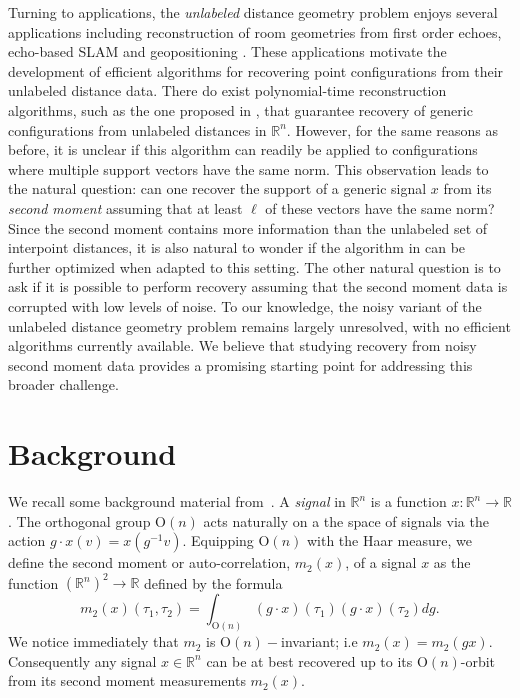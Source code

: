 \documentclass{article}
\theoremstyle{definition}
\renewcommand{\r}{\mathbb{R}}
\renewcommand{\|}{|}
\renewcommand{\O}{\mathrm{O}}
\begin{document}
Turning to applications, the \emph{unlabeled} distance geometry problem enjoys several applications including reconstruction of room geometries from first order echoes, echo-based SLAM  \cite{dokmanic2013echoes, dokmanic2014localize, boutin2020drone} and geopositioning \cite{boutin2024global, boutin2025developments}. These applications motivate the development of efficient algorithms for recovering point configurations from their unlabeled distance data. There do exist polynomial-time reconstruction algorithms, such as the one proposed in \cite{duxbury2016unassigned}, that guarantee recovery of generic configurations from unlabeled distances in $\r^n$. However, for the same reasons as before, it is unclear if this algorithm can readily be applied to configurations where multiple support vectors have the same norm. This observation leads to the natural question: can one recover the support of a generic signal $x$ from its \textit{second moment} assuming that at least $\ell$ of these vectors have the same norm? Since the second moment contains more information than the unlabeled set of interpoint distances, it is also natural to wonder if the algorithm in \cite{duxbury2016unassigned} can be further optimized when adapted to this setting. The other natural question is to ask if it is possible to perform recovery assuming that the second moment data is corrupted with low levels of noise. To our knowledge, the noisy variant of the unlabeled distance geometry problem remains largely unresolved, with no efficient algorithms currently available. We believe that studying recovery from noisy second moment data provides a promising starting point for addressing this broader challenge.



\section{Background}\label{sec:background}
We recall some background material from~\cite{bendory2024beltway}. A {\em signal} in $\r^n$ is a function $x:\r^n \to \r$. The orthogonal group $\O(n)$ acts naturally on a the space of
signals via 
the action $g \cdot x (v) = x (g^{-1}v)$. Equipping $\O(n)$ with the Haar measure, we define the second moment or auto-correlation, $m_2(x)$, of a signal $x$ as the function  $(\r^{n})^2 \to \r$ defined by the formula
$$m_2(x)(\tau_1, \tau_2) = \int_{\O(n)} (g\cdot x)(\tau_1) (g\cdot x)(\tau_2) dg.$$
We notice immediately that $m_2$ is $\O(n)-$invariant; i.e $m_2(x) = m_2(gx)$. Consequently any signal $x \in \r^n$ can be at best recovered up to its $\O(n)$-orbit from its second moment measurements $m_2(x)$.
\end{document}
